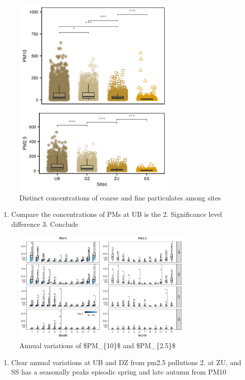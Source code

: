 \documentclass[
  11pt,
]{article}
\providecommand{\tightlist}{%
  \setlength{\itemsep}{0pt}\setlength{\parskip}{0pt}}
\begin{document}
\newpage

\begin{figure}
\centering
\includegraphics[width=3.125in,height=\textheight,keepaspectratio]{images/figure_3.png}
\caption{Distinct concentrations of coarse and fine particulates among
sites}
\end{figure}

\begin{enumerate}
\def\labelenumi{\arabic{enumi}.}
\tightlist
\item
  Compare the concentrations of PMs at UB is the 2. Significance level
  difference 3. Conclude
\end{enumerate}

\newpage

\begin{figure}
\centering
\includegraphics[width=3.4375in,height=\textheight,keepaspectratio]{images/figure_4.png}
\caption{Annual variations of \$PM\_\{10\}\$ and \$PM\_\{2.5\}\$}
\end{figure}

\begin{enumerate}
\def\labelenumi{\arabic{enumi}.}
\tightlist
\item
  Clear annual variations at UB and DZ from pm2.5 pollutions 2. at ZU,
  and SS has a seasonally peaks episodic spring and late autumn from
  PM10
\end{enumerate}
\end{document}
